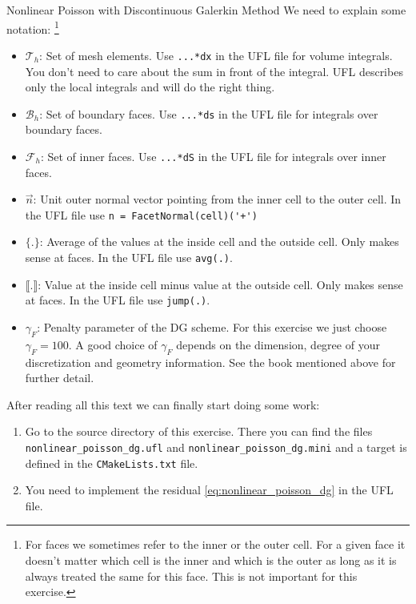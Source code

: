 \documentclass[12pt,a4paper]{article}
\newcommand\jump[1]{\llbracket #1 \rrbracket}
\newcommand\avg[1]{\{ #1 \}}
\begin{document}
\begin{Exercise}{Nonlinear Poisson with Discontinuous Galerkin Method}
  We need to explain some notation: \footnote{For faces we sometimes refer to the inner or the outer cell. For a given face it doesn't matter which cell is the inner and which is the outer as long as it is always treated the same for this face. This is not important for this exercise.}

  \begin{itemize}
  \item $\mathcal{T}_h$: Set of mesh elements. Use \lstinline{...*dx} in the
    UFL file for volume integrals. You don't need to care about the sum in
    front of the integral. UFL describes only the local integrals and will do
    the right thing.
  \item $\mathcal{B}_h$: Set of boundary faces. Use \lstinline{...*ds} in the
    UFL file for integrals over boundary faces.
  \item $\mathcal{F}_h$: Set of inner faces. Use \lstinline{...*dS} in the UFL
    file for integrals over inner faces.
  \item $\vec{n}$: Unit outer normal vector pointing from the inner cell to the
    outer cell. In the UFL file use \lstinline{n = FacetNormal(cell)('+')}
  \item $\avg{.}$: Average of the values at the inside cell and the outside
    cell. Only makes sense at faces. In the UFL file use \lstinline{avg(.)}.
  \item $\jump{.}$: Value at the inside cell minus value at the outside
    cell. Only makes sense at faces. In the UFL file use \lstinline{jump(.)}.
  \item $\gamma_F$: Penalty parameter of the DG scheme. For this exercise we
    just choose $\gamma_F = 100$. A good choice of $\gamma_F$ depends on the
    dimension, degree of your discretization and geometry information. See the
    book mentioned above for further detail.
  \end{itemize}

  After reading all this text we can finally start doing some work:
  \begin{enumerate}
  \item Go to the source directory of this exercise. There you can find the
    files \lstinline{nonlinear_poisson_dg.ufl} and
    \lstinline{nonlinear_poisson_dg.mini} and a target is defined in the
    \lstinline{CMakeLists.txt} file.
  \item You need to implement the residual \eqref{eq:nonlinear_poisson_dg} in
    the UFL file.
  \end{enumerate}

\end{Exercise}
\end{document}
